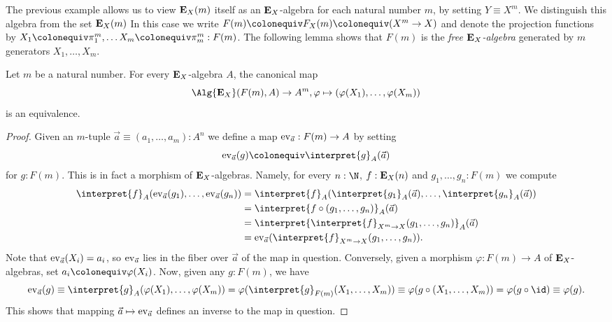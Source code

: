 {The previous example allows us to view \(\mathbf{E}_X(m)\) itself as an \(\mathbf{E}_X\)-algebra for each natural number \(m\), by setting \(Y\equiv X^m\).
We distinguish this algebra from the set \(\mathbf{E}_X(m)\)
In this case we write \(F(m)\colonequiv F_X(m)\colonequiv (X^m\to X)\) and denote the projection functions by \(X_1\colonequiv \pi^m_1, \dots X_m\colonequiv\pi^m_m : F(m)\).
The following lemma shows that \(F(m)\) is the \emph{free \(\mathbf{E}_X\)-algebra} generated by \(m\) generators \(X_1,\dots,X_m\).

\begin{lemma}
  Let \(m\) be a natural number.
  For every \(\mathbf{E}_X\)-algebra \(A\), the canonical map
  \[
    \Alg{\EE_X}(F(m),A) \to A^m, \varphi \mapsto (\varphi(X_1),\dots,\varphi(X_m))
  \]
  is an equivalence.
\end{lemma}
\begin{proof}
  Given an \(m\)-tuple \(\vec a\equiv (a_1,\dots,a_m) : A^n\) we define a map \(\operatorname{\mathrm{ev}}_{\vec a} : F(m)\to A\) by setting
  \[\ev_{\vec a}(g) \colonequiv \interpret{g}_A(\vec a)\]
  for \(g:F(m)\).
  This is in fact a morphism of \(\mathbf{E}_X\)-algebras.
  Namely, for every \(n:\N\), \(f:\mathbf{E}_X(n)\) and \(g_1,\dots,g_n : F(m)\) we compute
  \begin{align*}
    \interpret{f}_A(\ev_{\vec a}(g_1),\dots,\ev_{\vec a}(g_n)) & = \interpret{f}_A(\interpret{g_1}_A(\vec a),\dots,\interpret{g_n}_A(\vec a)) \\
    & = \interpret{f\circ(g_1,\dots,g_n)}_A (\vec a)\\
    & = \interpret{\interpret{f}_{X^m\to X}(g_1,\dots,g_n)}_A (\vec a)\\
    & = \ev_{\vec a}(\interpret{f}_{X^m \to X}(g_1,\dots,g_n)).
  \end{align*}
  Note that \(\operatorname{\mathrm{ev}}_{\vec a}(X_i) = a_i\), so \(\operatorname{\mathrm{ev}}_{\vec a}\) lies in the fiber over \(\vec a\) of the map in question.
  Conversely, given a morphism \(\varphi : F(m)\to A\) of \(\mathbf{E}_X\)-algebras, set \(a_i\colonequiv \varphi(X_i)\).
  Now, given any \(g:F(m)\), we have
  \begin{equation*}
    \ev_{\vec a}(g)
    \equiv \interpret{g}_A(\varphi(X_1),\dots,\varphi(X_m))
     = \varphi(\interpret{g}_{F(m)}(X_1,\dots,X_m))
     \equiv \varphi(g\circ (X_1,\dots,X_m))
     = \varphi(g\circ\id) \equiv \varphi(g).
  \end{equation*}
  This shows that mapping \(\vec a \mapsto \operatorname{\mathrm{ev}}_{\vec a}\) defines an inverse to the map in question.
\end{proof}

}
